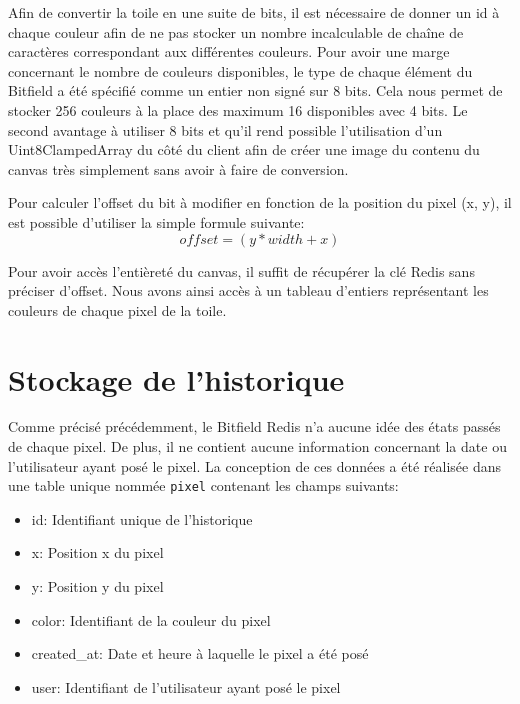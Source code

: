 Afin de convertir la toile en une suite de bits, il est nécessaire de donner un id à chaque couleur afin de ne pas stocker un nombre incalculable de chaîne de caractères correspondant aux différentes couleurs. Pour avoir une marge concernant le nombre de couleurs disponibles, le type de chaque élément du Bitfield a été spécifié comme un entier non signé sur 8 bits. Cela nous permet de stocker 256 couleurs à la place des maximum 16 disponibles avec 4 bits. Le second avantage à utiliser 8 bits et qu'il rend possible l'utilisation d'un Uint8ClampedArray \cite{uint8clampedarray} du côté du client afin de créer une image du contenu du canvas très simplement sans avoir à faire de conversion.

Pour calculer l'offset du bit à modifier en fonction de la position du pixel (x, y), il est possible d'utiliser la simple formule suivante:
\begin{equation}
  offset = (y * width + x)
\end{equation}

Pour avoir accès l'entièreté du canvas, il suffit de récupérer la clé Redis sans préciser d'offset. Nous avons ainsi accès à un tableau d'entiers représentant les couleurs de chaque pixel de la toile.

\section{Stockage de l'historique}

Comme précisé précédemment, le Bitfield Redis n'a aucune idée des états passés de chaque pixel. De plus, il ne contient aucune information concernant la date ou l'utilisateur ayant posé le pixel. La conception de ces données a été réalisée dans une table unique nommée \texttt{pixel} contenant les champs suivants:

\begin{itemize}
  \item id: Identifiant unique de l'historique
  \item x: Position x du pixel
  \item y: Position y du pixel
  \item color: Identifiant de la couleur du pixel
  \item created\_at: Date et heure à laquelle le pixel a été posé
  \item user: Identifiant de l'utilisateur ayant posé le pixel
\end{itemize}



